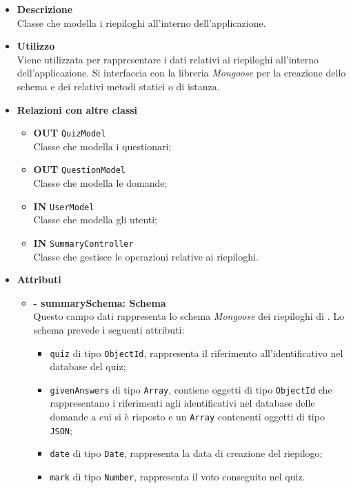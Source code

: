 \begin{itemize}
	\item \textbf{Descrizione} \\
	Classe che modella i riepiloghi all'interno dell'applicazione.
	\item \textbf{Utilizzo} \\
	Viene utilizzata per rappresentare i dati relativi ai riepiloghi all'interno dell'applicazione. Si interfaccia con la libreria \textit{Mongoose} per la creazione dello schema e dei relativi metodi statici o di istanza.
	\item \textbf{Relazioni con altre classi}
		\begin{itemize}
			\item \textbf{OUT} \texttt{QuizModel}\\
			Classe che modella i questionari;
			\item \textbf{OUT} \texttt{QuestionModel}\\
			Classe che modella le domande;
			\item \textbf{IN} \texttt{UserModel}\\
			Classe che modella gli utenti;
			\item \textbf{IN} \texttt{SummaryController}\\
			Classe che gestisce le operazioni relative ai riepiloghi.
		\end{itemize}
	\item \textbf{Attributi}
		\begin{itemize}
			\item \textbf{- summarySchema: Schema} \\
			Questo campo dati rappresenta lo schema \textit{Mongoose} dei riepiloghi di \progetto. Lo schema prevede i seguenti attributi:
				\begin{itemize}
					\item \texttt{quiz} di tipo \texttt{ObjectId}, rappresenta il riferimento all'identificativo nel database del quiz;
					\item \texttt{givenAnswers} di tipo \texttt{Array}, contiene oggetti di tipo \texttt{ObjectId} che rappresentano i riferimenti agli identificativi nel database delle domande a cui si è risposto e un \texttt{Array} contenenti oggetti di tipo \texttt{JSON};	
					\item \texttt{date} di tipo \texttt{Date}, rappresenta la data di creazione del riepilogo;
					\item \texttt{mark} di tipo \texttt{Number}, rappresenta il voto conseguito nel quiz.

\end{itemize}
\end{itemize}
\end{itemize}
